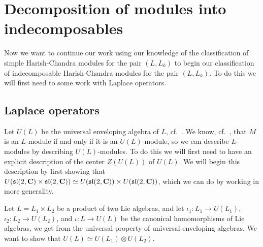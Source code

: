 \section{Decomposition of modules into indecomposables}

Now we want to continue our work using our knowledge of the classification of simple Harish-Chandra modules for the pair $(L,L_k)$ to begin our classification of indecomposable Harish-Chandra modules for the pair $(L,L_k)$. To do this we will first need to some work with Laplace operators.

\subsection{Laplace operators}

Let $U(L)$ be the universal enveloping algebra of $L$, cf.\ \cite[Appendix~E]{jantzen}. We know, cf.\ \cite[p.~E-9]{jantzen}, that $M$ is an $L$-module if and only if it is an $U(L)$-module, so we can describe $L$-modules by describing $U(L)$-modules. To do this we will first need to have an explicit description of the center $Z(U(L))$ of $U(L)$. We will begin this description by first showing that $U(\mathfrak{sl}(2,\mathbf{C})\times \mathfrak{sl}(2,\mathbf{C}))\simeq U(\mathfrak{sl}(2,\mathbf{C}))\times U(\mathfrak{sl}(2,\mathbf{C}))$, which we can do by working in more generality.

Let $L=L_1\times L_2$ be a product of two Lie algebras, and let $\iota_1\colon L_1\to U(L_1)$, $\iota_2\colon L_2\to U(L_2)$, and $\iota\colon L\to U(L)$ be the canonical homomorphisms of Lie algebras, we get from the universal property of universal enveloping algebras. We want to show that $U(L)\simeq U(L_1)\otimes U(L_2)$.

